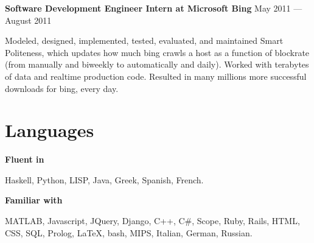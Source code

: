 \documentclass[margin,line]{resume}
\begin{document}
\begin{resume}
  \textbf{Software Development Engineer Intern at Microsoft Bing}  \hfill May 2011 — August 2011  \par\vspace{-4.0mm}
          {\addtolength{\leftskip}{2 mm}
           Modeled, designed, implemented, tested, evaluated, and maintained Smart Politeness, which updates how much bing crawls a host as a function of blockrate (from manually and biweekly to automatically and daily). Worked with terabytes of data and realtime production code. Resulted in many millions more successful downloads for bing, every day. 
 \par}

    \section{\mysidestyle{} Languages} 

    \textbf{Fluent in} \par\vspace{-4mm}
    {\addtolength{\leftskip}{2 mm} 
     Haskell, Python, LISP, Java, Greek, Spanish, French.
     }

    \textbf{Familiar with}\par\vspace{-4mm}
    {\addtolength{\leftskip}{2 mm} 
      MATLAB, Javascript, JQuery, Django, C++, C\#, Scope,  Ruby, Rails, HTML, CSS,  SQL, Prolog, \LaTeX, bash, MIPS, Italian, German, Russian.
    \par}



\end{resume}
\end{document}

